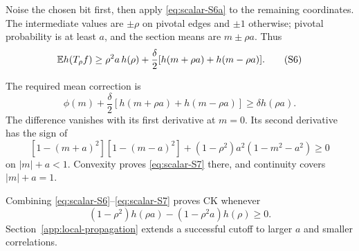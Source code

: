 Noise the chosen bit first, then apply \eqref{eq:scalar-S6a} to the
remaining coordinates. The intermediate values are \(\pm\rho\) on
pivotal edges and \(\pm1\) otherwise; pivotal probability is at least
\(a\), and the section means are \(m\pm\rho a\). Thus
\[
 \mathbb E h(T_\rho f)\ge\rho^2a\,h(\rho)
                      +\frac{\delta}{2}[h(m+\rho a)+h(m-\rho a)]. \tag{S6}\label{eq:scalar-S6}
\]

The required mean correction is
\[
 \phi(m)+\frac{\delta}{2}[h(m+\rho a)+h(m-\rho a)]
                              \ge\delta h(\rho a).    \tag{S7}\label{eq:scalar-S7}
\]
The difference vanishes with its first derivative at \(m=0\).
Its second derivative has the sign of
\[
 [1-(m+a)^2][1-(m-a)^2]
          +(1-\rho^2)a^2(1-m^2-a^2)\ge0
\]
on \(|m|+a<1\). Convexity proves \eqref{eq:scalar-S7} there,
and continuity covers \(|m|+a=1\).

Combining \eqref{eq:scalar-S6}--\eqref{eq:scalar-S7} proves CK whenever \[
                 (1-\rho^2)h(\rho a)
                    -(1-\rho^2a)h(\rho)\ge0.          \tag{S8}\label{eq:scalar-S8}
\]
Section~\ref{app:local-propagation} extends a successful cutoff to
larger \(a\) and smaller correlations.
